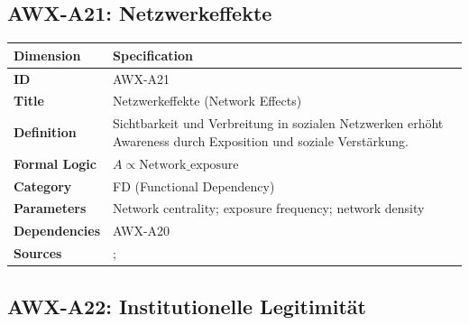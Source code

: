 
\subsection{AWX-A21: Netzwerkeffekte}

\begin{table}[htbp]
\small
\begin{tabular}{p{3cm}p{11cm}}
\toprule
\textbf{Dimension} & \textbf{Specification} \\
\midrule
\textbf{ID} & AWX-A21 \\
\textbf{Title} & Netzwerkeffekte (Network Effects) \\
\textbf{Definition} & Sichtbarkeit und Verbreitung in sozialen Netzwerken erhöht Awareness durch Exposition und soziale Verstärkung. \\
\textbf{Formal Logic} & $A \propto \text{Network\_exposure}$ \\
\textbf{Category} & FD (Functional Dependency) \\
\textbf{Parameters} & Network centrality; exposure frequency; network density \\
\textbf{Dependencies} & AWX-A20 \\
\textbf{Sources} & \citet{christakis2009connected}; \citet{jackson2008social} \\
\bottomrule
\end{tabular}
\end{table}


\subsection{AWX-A22: Institutionelle Legitimität}

